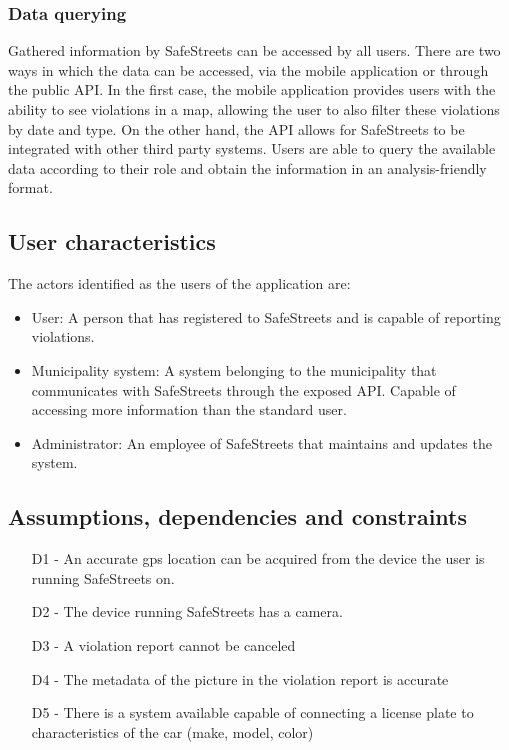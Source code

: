 \subsubsection{Data querying}
Gathered information by SafeStreets can be accessed by all users. There are two ways in which the data can be accessed, via the mobile application or through the public API.
In the first case, the mobile application provides users with the ability to see violations in a map, allowing the user to also filter these violations by date and type. 
On the other hand, the API allows for SafeStreets to be integrated with other third party systems. Users are able to query the available data according to their role and obtain the information in an analysis-friendly format.

\subsection{User characteristics}
The actors identified as the users of the application are:
\begin{itemize}
\item
User: A person that has registered to SafeStreets and is capable of reporting violations. 
\item
Municipality system: A system belonging to the municipality that communicates with SafeStreets through the exposed API. Capable of accessing more information than the standard user.
\item
Administrator: An employee of SafeStreets that maintains and updates the system.
\end{itemize}

\subsection{Assumptions, dependencies and constraints}

\begin{itemize}
\item
[D1] - An accurate gps location can be acquired from the device the user is running SafeStreets on.
\item
[D2] - The device running SafeStreets has a camera.
\item
[D3] - A violation report cannot be canceled
\item
[D4] - The metadata of the picture in the violation report is accurate
\item
[D5] - There is a system available capable of connecting a license plate to characteristics of the car (make, model, color)
\end{itemize}




